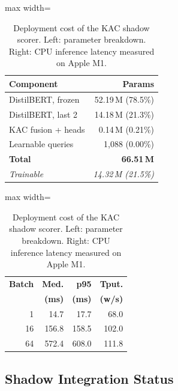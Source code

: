 \documentclass[conference]{IEEEtran}
\begin{document}
\begin{table}[t]
  \centering
  \caption{Deployment cost of the KAC shadow scorer. Left: parameter breakdown. Right: CPU inference latency measured on Apple M1.}
  \label{tab:deployment_cost}
  \small
  \setlength{\tabcolsep}{3pt}
  \begin{minipage}[t]{0.48\linewidth}
    \centering
    \begin{adjustbox}{max width=\linewidth}
    \begin{tabular}{@{}lr@{}}
      \toprule
      \textbf{Component} & \textbf{Params} \\
      \midrule
      DistilBERT, frozen   & 52.19\,M (78.5\%) \\
      DistilBERT, last 2   & 14.18\,M (21.3\%) \\
      KAC fusion + heads   & 0.14\,M (0.21\%) \\
      Learnable queries    & 1{,}088 (0.00\%) \\
      \midrule
      \textbf{Total}       & \textbf{66.51\,M} \\
      \emph{Trainable}     & \emph{14.32\,M (21.5\%)} \\
      \bottomrule
    \end{tabular}
    \end{adjustbox}
  \end{minipage}%
  \hfill
  \begin{minipage}[t]{0.48\linewidth}
    \centering
    \begin{adjustbox}{max width=\linewidth}
    \begin{tabular}{@{}rrrr@{}}
      \toprule
      \textbf{Batch} & \textbf{Med.} & \textbf{p95} & \textbf{Tput.} \\
                     & \textbf{(ms)} & \textbf{(ms)} & \textbf{(w/s)} \\
      \midrule
      1  & 14.7  & 17.7  & 68.0  \\
      16 & 156.8 & 158.5 & 102.0 \\
      64 & 572.4 & 608.0 & 111.8 \\
      \bottomrule
    \end{tabular}
    \end{adjustbox}
  \end{minipage}
\end{table}

\subsection{Shadow Integration Status}
\label{sec:deployment_status}
\end{document}
